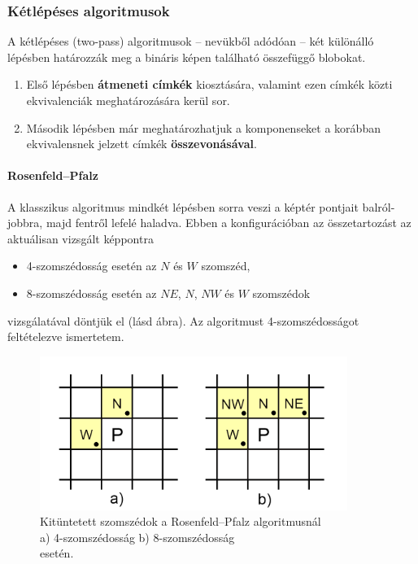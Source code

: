 \subsubsection{Kétlépéses algoritmusok}\label{sect:blob_ketlepes}

A kétlépéses (two-pass) algoritmusok -- nevükből adódóan -- két különálló lépésben határozzák meg a bináris képen található összefüggő blobokat.

\begin{enumerate}
  \item Első lépésben \textbf{átmeneti címkék} kiosztására, valamint ezen címkék közti ekvivalenciák meghatározására kerül sor.
  \item Második lépésben már meghatározhatjuk a komponenseket a korábban ekvivalensnek jelzett címkék \textbf{összevonásával}.
\end{enumerate}

\paragraph{Rosenfeld--Pfalz}

A klasszikus algoritmus \cite{rosenfeld} mindkét lépésben sorra veszi a képtér pontjait balról-jobbra, majd fentről lefelé haladva. Ebben a konfigurációban az összetartozást az aktuálisan vizsgált képpontra

\begin{itemize}
  \item 4-szomszédosság esetén az $N$ és $W$ szomszéd,
  \item 8-szomszédosság esetén az $NE$, $N$, $NW$ és $W$ szomszédok
\end{itemize}

vizsgálatával döntjük el (lásd  ábra). Az algoritmust 4-szomszédosságot feltételezve ismertetem.

\begin{figure}[!ht]
\centering
\includegraphics[width=100mm, keepaspectratio]{figures/2pass_neighbours.png}
\caption{Kitüntetett szomszédok a Rosenfeld--Pfalz algoritmusnál \\ a) 4-szomszédosság b) 8-szomszédosság \\ esetén.}
\label{fig:2pass_neighbours}
\end{figure}

